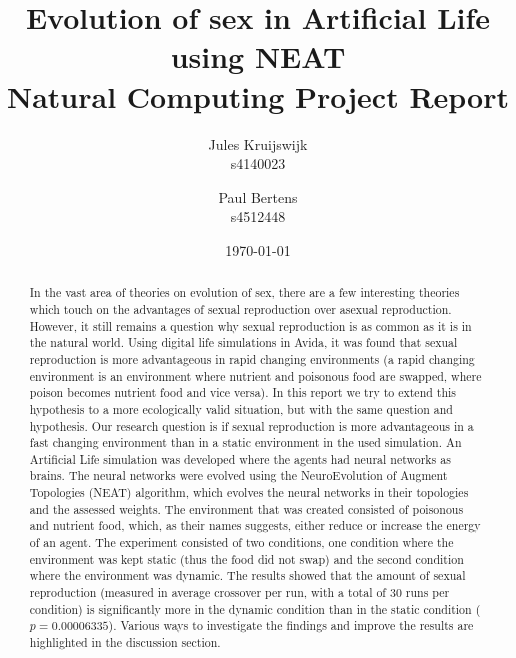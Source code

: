 \documentclass[titlepage, 12pt]{article}
\title{Evolution of sex in Artificial Life using NEAT \\ \large Natural Computing Project Report}
\author{Jules Kruijswijk \\ s4140023 \and Paul Bertens \\ s4512448}
\date{\today}
\begin{document}
\maketitle

\tableofcontents

\newpage

\begin{abstract}
In the vast area of theories on evolution of sex, there are a few interesting theories which touch on the advantages of sexual reproduction over asexual reproduction.
However, it still remains a question why sexual reproduction is as common as it is in the natural world.
Using digital life simulations in Avida, it was found that sexual reproduction is more advantageous in rapid changing environments (a rapid changing environment is an environment where nutrient and poisonous food are swapped, where poison becomes nutrient food and vice versa).
In this report we try to extend this hypothesis to a more ecologically valid situation, but with the same question and hypothesis.
Our research question is if sexual reproduction is more advantageous in a fast changing environment than in a static environment in the used simulation.
An Artificial Life simulation was developed where the agents had neural networks as brains.
The neural networks were evolved using the NeuroEvolution of Augment Topologies (NEAT) algorithm, which evolves the neural networks in their topologies and the assessed weights.
The environment that was created consisted of poisonous and nutrient food, which, as their names suggests, either reduce or increase the energy of an agent.
The experiment consisted of two conditions, one condition where the environment was kept static (thus the food did not swap) and the second condition where the environment was dynamic.
The results showed that the amount of sexual reproduction (measured in average crossover per run, with a total of 30 runs per condition) is significantly more in the dynamic condition than in the static condition ($p = 0.00006335$).
Various ways to investigate the findings and improve the results are highlighted in the discussion section.
\end{abstract}











\end{document}
